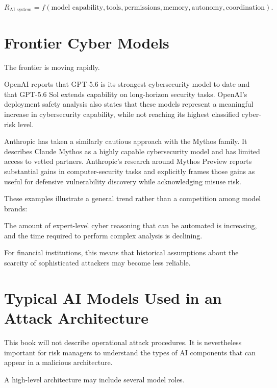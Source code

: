 \begin{equation}
R_{\text{AI system}}
=
f(
\text{model capability},
\text{tools},
\text{permissions},
\text{memory},
\text{autonomy},
\text{coordination}
).
\end{equation}

\section{Frontier Cyber Models}

The frontier is moving rapidly.

OpenAI reports that GPT-5.6 is its strongest cybersecurity model to date and that GPT-5.6 Sol extends capability on long-horizon security tasks. OpenAI's deployment safety analysis also states that these models represent a meaningful increase in cybersecurity capability, while not reaching its highest classified cyber-risk level.

Anthropic has taken a similarly cautious approach with the Mythos family. It describes Claude Mythos as a highly capable cybersecurity model and has limited access to vetted partners. Anthropic's research around Mythos Preview reports substantial gains in computer-security tasks and explicitly frames those gains as useful for defensive vulnerability discovery while acknowledging misuse risk.

These examples illustrate a general trend rather than a competition among model brands:

\begin{intuition}
The amount of expert-level cyber reasoning that can be automated is increasing, and the time required to perform complex analysis is declining.
\end{intuition}

For financial institutions, this means that historical assumptions about the scarcity of sophisticated attackers may become less reliable.

\section{Typical AI Models Used in an Attack Architecture}

This book will not describe operational attack procedures. It is nevertheless important for risk managers to understand the types of AI components that can appear in a malicious architecture.

A high-level architecture may include several model roles.

